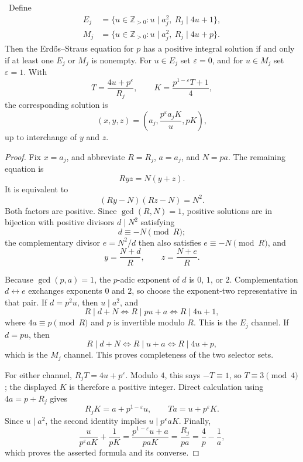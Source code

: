\begin{proposition}
\label{prop:es-two-channel-selector}
\Verified\ Define
\[
 \begin{aligned}
 E_j&=\{u\in\mathbb Z_{>0}:u\mid a_j^2,\ R_j\mid4u+1\},\\
 M_j&=\{u\in\mathbb Z_{>0}:u\mid a_j^2,\ R_j\mid4u+p\}.
 \end{aligned}
\]
Then the Erd\H{o}s--Straus equation for \(p\) has a positive integral
solution if and only if at least one \(E_j\) or \(M_j\) is nonempty.
For \(u\in E_j\) set \(\varepsilon=0\), and for \(u\in M_j\) set
\(\varepsilon=1\).  With
\[
 T=\frac{4u+p^\varepsilon}{R_j},\qquad
 K=\frac{p^{1-\varepsilon}T+1}{4},
\]
the corresponding solution is
\[
 (x,y,z)=
 \left(a_j,\frac{p^\varepsilon a_jK}{u},pK\right),
\]
up to interchange of \(y\) and \(z\).
\end{proposition}

\begin{proof}
Fix \(x=a_j\), and abbreviate \(R=R_j\), \(a=a_j\), and \(N=pa\).
The remaining equation is
\[
 Ryz=N(y+z).
\]
It is equivalent to
\[
 (Ry-N)(Rz-N)=N^2.
\]
Both factors are positive.  Since \(\gcd(R,N)=1\), positive solutions are in
bijection with positive divisors \(d\mid N^2\) satisfying
\[
 d\equiv-N\pmod R;
\]
the complementary divisor \(e=N^2/d\) then also satisfies
\(e\equiv-N\pmod R\), and
\[
 y=\frac{N+d}{R},\qquad z=\frac{N+e}{R}.
\]

Because \(\gcd(p,a)=1\), the \(p\)-adic exponent of \(d\) is \(0\), \(1\),
or \(2\).  Complementation \(d\leftrightarrow e\) exchanges exponents \(0\)
and \(2\), so choose the exponent-two representative in that pair.  If
\(d=p^2u\), then \(u\mid a^2\), and
\[
 R\mid d+N
 \Longleftrightarrow R\mid pu+a
 \Longleftrightarrow R\mid4u+1,
\]
where \(4a\equiv p\pmod R\) and \(p\) is invertible modulo \(R\).  This is
the \(E_j\) channel.  If \(d=pu\), then
\[
 R\mid d+N
 \Longleftrightarrow R\mid u+a
 \Longleftrightarrow R\mid4u+p,
\]
which is the \(M_j\) channel.  This proves completeness of the two selector
sets.

For either channel, \(R_jT=4u+p^\varepsilon\).  Modulo \(4\), this says
\(-T\equiv1\), so \(T\equiv3\pmod4\); the displayed \(K\) is therefore a
positive integer.  Direct calculation using \(4a=p+R_j\) gives
\[
 R_jK=a+p^{1-\varepsilon}u,
 \qquad Ta=u+p^\varepsilon K.
\]
Since \(u\mid a^2\), the second identity implies
\(u\mid p^\varepsilon aK\).  Finally,
\[
 \frac{u}{p^\varepsilon aK}+\frac1{pK}
 =\frac{p^{1-\varepsilon}u+a}{paK}
 =\frac{R_j}{pa}
 =\frac4p-\frac1a,
\]
which proves the asserted formula and its converse.
\end{proof}


